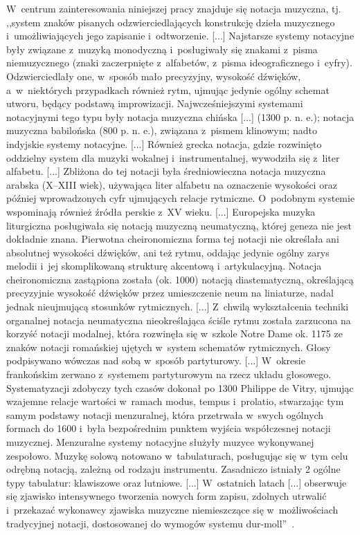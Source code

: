 \documentclass[polish,thesis,12pt]{dcsbook}
\begin{document}
W~centrum zainteresowania niniejszej pracy znajduje się notacja muzyczna, tj. ,,system znaków pisanych odzwierciedlających konstrukcję dzieła muzycznego i~umożliwiających jego zapisanie i~odtworzenie. [...] Najstarsze systemy notacyjne były związane z~muzyką monodyczną i~posługiwały się znakami z~pisma niemuzycznego (znaki zaczerpnięte z~alfabetów, z~pisma ideograficznego i~cyfry). Odzwierciedlały one, w~sposób mało precyzyjny, wysokość dźwięków, a~w~niektórych przypadkach również rytm, ujmując jedynie ogólny schemat utworu, będący podstawą improwizacji. Najwcześniejszymi systemami notacyjnymi tego typu były notacja muzyczna chińska [...] (1300 p. n. e.); notacja muzyczna babilońska (800 p. n. e.), związana z~pismem klinowym; nadto indyjskie systemy notacyjne. [...] Również grecka notacja, gdzie rozwinięto oddzielny system dla muzyki wokalnej i~instrumentalnej, wywodziła się z~liter alfabetu. [...] Zbliżona do tej notacji była średniowieczna notacja muzyczna arabska (X--XIII wiek), używająca liter alfabetu na oznaczenie wysokości oraz później wprowadzonych cyfr ujmujących relacje rytmiczne. O~podobnym systemie wspominają również źródła perskie z~XV wieku. [...] Europejska muzyka liturgiczna posługiwała się notacją muzyczną neumatyczną, której geneza nie jest dokładnie znana. Pierwotna cheironomiczna forma tej notacji nie określała ani absolutnej wysokości dźwięków, ani też rytmu, oddając jedynie ogólny zarys melodii i~jej skomplikowaną strukturę akcentową i~artykulacyjną. Notacja cheironomiczna zastąpiona została (ok. 1000) notacją diastematyczną, określającą precyzyjnie wysokość dźwięków przez umieszczenie neum na liniaturze, nadal jednak nieujmującą stosunków rytmicznych. [...] Z~chwilą wykształcenia techniki organalnej notacja neumatyczna nieokreślająca ściśle rytmu została zarzucona na korzyść notacji modalnej, która rozwinęła się w~szkole Notre Dame ok. 1175 ze znaków notacji romańskiej ujętych w~system schematów rytmicznych. Głosy podpisywano wówczas nad sobą w~sposób partyturowy. [...] W~okresie frankońskim zerwano z~systemem partyturowym na rzecz układu głosowego. Systematyzacji zdobyczy tych czasów dokonał po 1300 Philippe de Vitry, ujmując wzajemne relacje wartości w~ramach modus, tempus i~prolatio, stwarzając tym samym podstawy notacji menzuralnej, która przetrwała w~swych ogólnych formach do 1600 i~była bezpośrednim punktem wyjścia współczesnej notacji muzycznej. Menzuralne systemy notacyjne służyły muzyce wykonywanej zespołowo. Muzykę solową notowano w~tabulaturach, posługując się w~tym celu odrębną notacją, zależną od rodzaju instrumentu. Zasadniczo istniały 2 ogólne typy tabulatur: klawiszowe oraz lutniowe. [...] W~ostatnich latach [...] obserwuje się zjawisko intensywnego tworzenia nowych form zapisu, zdolnych utrwalić i~przekazać wykonawcy zjawiska muzyczne niemieszczące się w~możliwościach tradycyjnej notacji, dostosowanej do wymogów systemu dur-moll''~\cite{Encyklopedia}.
\end{document}
